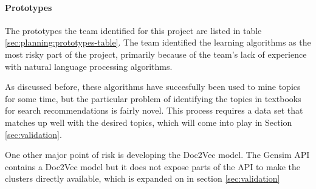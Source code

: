 
\paragraph{Prototypes}
\label{sec:planning}
The prototypes the team identified for this project are listed in
table \ref{sec:planning:prototypes-table}.
The team identified the learning algorithms as the most risky part of
the project, primarily because of the team's lack of experience
with natural language processing algorithms.  

As discussed before, these algorithms have succesfully been used to
mine topics for some time, but the particular problem of identifying
the topics in textbooks for search recommendations is fairly novel.
This process requires a data set that matches up well with the desired
topics, which will come into play in Section \ref{sec:validation}.

One other major point of risk is developing the Doc2Vec model.
The Gensim API contains a Doc2Vec model but it does not expose parts
of the API to make the clusters directly available, which is expanded
on in section \ref{sec:validation}


